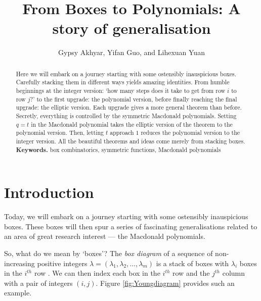 \documentclass[a4paper,11pt]{amsart}
\title{
 From Boxes to Polynomials: A story of generalisation}
\author{Gypsy Akhyar, Yifan Guo, and Lihexuan Yuan}
\begin{document}
	\maketitle
    \begin{abstract}
        Here we will embark on a journey starting with some ostensibly inauspicious boxes. Carefully stacking them in different ways yields amazing identities. From humble beginnings at the integer version: `how many steps does it take to get from row $i$ to row $j$?' to the first upgrade: the polynomial version, before finally reaching the final upgrade: the elliptic version. Each upgrade gives a more general theorem than before. Secretly, everything is controlled by the symmetric Macdonald polynomials. Setting $q = t$ in the Macdonald polynomial takes the elliptic version of the theorem to the polynomial version. Then, letting $t$ approach $1$ reduces the polynomial version to the integer version. All the beautiful theorems and ideas come merely from stacking boxes. \\
        
        \smallskip
        \noindent \textbf{Keywords.} box combinatorics, symmetric functions, Macdonald polynomials
    \end{abstract}
	
	\section{Introduction}
	Today, we will embark on a journey starting with some ostensibly inauspicious boxes. These boxes  will then spur a series of fascinating generalisations related to an area of great research interest --- the Macdonald polynomials.
	
	So, what do we mean by `boxes'? The \textit{box diagram} of a sequence of non-increasing positive integers $\lambda = (\lambda_1, \lambda_2, \ldots, \lambda_m)$ is a stack of boxes with $\lambda_i$ boxes in the $i^{th}$ row \cite[Ch.\ I §1 p.\ 2]{MR1354144}. We can then index each box in the $i^{th}$ row and the $j^{th}$ column with a pair of integers $(i,j)$. Figure \ref{fig:Youngdiagram} provides such an example.
\end{document}
